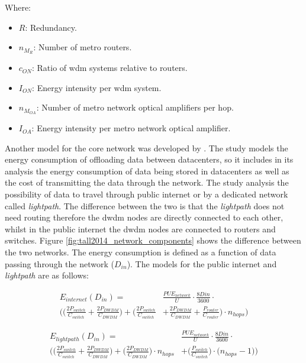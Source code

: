 Where:

\begin{itemize}
    \item $R$: Redundancy.
    \item $n_{M_R}$: Number of metro routers.
    \item $c_{ON}$: Ratio of \ac{wdm} systems relative to routers.
    \item $I_{ON}$: Energy intensity per \ac{wdm} system.
    \item $n_{M_{OA}}$: Number of metro network optical amplifiers per hop.
    \item $I_{OA}$: Energy intensity per metro network optical amplifier.
\end{itemize}


Another model for the core network was developed by \citet{Tall2014}. The study models the energy consumption of offloading data between datacenters, so it includes in  its analysis the energy consumption of data being stored in datacenters as well as the cost of transmitting the data through the network. 
The study analysis the possibility of data to travel through public internet or by a dedicated network called \textit{lightpath}. The difference between the two is that the \textit{lightpath} does not need routing therefore the \ac{dwdm} nodes are directly connected to each other, whilst in the public internet the \ac{dwdm} nodes are connected to routers and switches. Figure \ref{fig:tall2014_network_components} shows the difference between the two networks. The energy consumption is defined as a function of data passing through the network ($D_{in}$). The models for the public internet and \textit{lightpath} are as follows:

\begin{equation}
\label{formula:tall_public_internet}
\begin{split}
    E_{internet}(D_{in}) = & \frac{PUE_{network}}{U} \cdot \frac{8D{in}}{3600} \cdot \\
    \Bigg( \bigg( \frac{2P_{switch}}{C_{switch}} + \frac{2P_{DWDM}}{C_{DWDM}} \bigg) + \bigg(\frac{2P_{switch}}{C_{switch}} & + \frac{2P_{DWDM}}{C_{DWDM}} + \frac{P_{router}}{C_{router}}\bigg) \cdot n_{hops} \Bigg)
\end{split}
\end{equation}

\begin{equation}
\label{formula:tall_lightpath}
\begin{split}
    E_{lightpath}(D_{in}) = & \frac{PUE_{network}}{U} \cdot \frac{8D{in}}{3600} \cdot \\
    \Bigg( \bigg( \frac{2P_{switch}}{C_{switch}} + \frac{2P_{DWDM}}{C_{DWDM}} \bigg) + \bigg(\frac{2P_{DWDM}}{C_{DWDM}}\bigg) \cdot n_{hops} & + \bigg( \frac{P_{switch}}{C_{switch}} \bigg) \cdot \bigg( n_{hops} - 1 \bigg) \Bigg)
\end{split}
\end{equation}

